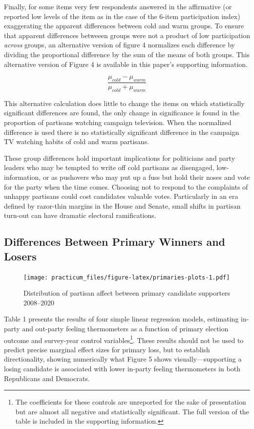 \documentclass[
]{article}
\begin{document}
Finally, for some items very few respondents answered in the affirmative (or reported low levels of the item as in the case of the 6-item participation index) exaggerating the apparent differences between cold and warm groups. To ensure that apparent differences betweeen groups were not a product of low participation \emph{across} groups, an alternative version of figure 4 normalizes each difference by dividing the proportional difference by the sum of the means of both groups. This alternative version of Figure 4 is available in this paper's supporting information.

\[
\frac{\mu_{cold} - \mu_{warm}}{\mu_{cold} + \mu_{warm}}
\]

This alternative calculation does little to change the items on which statistically significant differences are found, the only change in significance is found in the proportion of partisans watching campaign television. When the normalized difference is used there is no statistically significant difference in the campaign TV watching habits of cold and warm partisans.

These group differences hold important implications for politicians and party leaders who may be tempted to write off cold partisans as disengaged, low-information, or as pushovers who may put up a fuss but hold their noses and vote for the party when the time comes. Choosing not to respond to the complaints of unhappy partisans could cost candidates valuable votes. Particularly in an era defined by razor-thin margins in the House and Senate, small shifts in partisan turn-out can have dramatic electoral ramifications.

\hypertarget{differences-between-primary-winners-and-losers}{%
\subsection{Differences Between Primary Winners and Losers}\label{differences-between-primary-winners-and-losers}}

\begin{figure}
\centering
\texttt{[image: practicum\_files/figure-latex/primaries-plots-1.pdf]}
\caption{\label{fig:primaries-plots}Distribution of partisan affect between primary candidate supporters 2008--2020}
\end{figure}

Table 1 presents the results of four simple linear regression models, estimating in-party and out-party feeling thermometers as a function of primary election outcome and survey-year control variables\footnote{The coefficients for these controls are unreported for the sake of presentation but are almost all negative and statistically significant. The full version of the table is included in the supporting information.}. These results should not be used to predict precise marginal effect sizes for primary loss, but to establish directionality, showing numerically what Figure 5 shows visually---supporting a losing candidate is associated with lower in-party feeling thermometers in both Republicans and Democrats.
\end{document}
